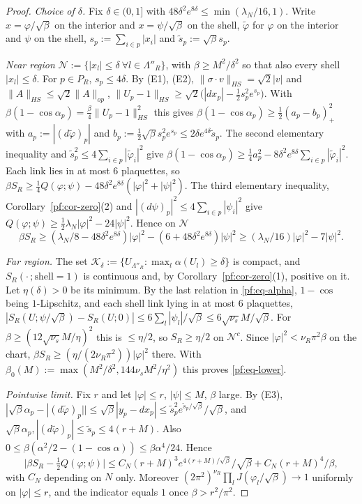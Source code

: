\begin{proof}
\emph{Choice of $\delta$.} Fix $\delta\in(0,1]$ with $48\delta^2e^{8\delta}\le\min(\lambda_N/16,1)$. Write $x=\varphi/\sqrt\beta$ on the interior and $x=\psi/\sqrt\beta$ on the shell, $\tilde\varphi$ for $\varphi$ on the interior and $\psi$ on the shell, $s_p:=\sum_{i\in p}|x_i|$ and $\tilde s_p:=\sqrt\beta s_p$.

\emph{Near region} $\mathcal N:=\{|x_l|\le\delta\ \forall l\in\Lambda''_R\}$, with $\beta\ge M^2/\delta^2$ so that also every shell $|x_l|\le\delta$. For $p\in P_R$, $s_p\le4\delta$. By (E1), (E2), $\|\sigma\cdot v\|_{HS}=\sqrt2|v|$ and $\|A\|_{HS}\le\sqrt2\|A\|_{op}$,
$\|U_p-1\|_{HS}\ge\sqrt2\big(|dx_p|-\tfrac12s_p^2e^{s_p}\big)$. With $\beta(1-\cos\alpha_p)=\frac\beta4\|U_p-1\|^2_{HS}$ this gives $\beta(1-\cos\alpha_p)\ge\tfrac12(a_p-b_p)_+^2$ with $a_p:=|(d\tilde\varphi)_p|$ and $b_p:=\tfrac12\sqrt\beta s_p^2e^{s_p}\le2\delta e^{4\delta}\tilde s_p$. The second elementary inequality and $\tilde s_p^2\le4\sum_{i\in p}|\tilde\varphi_i|^2$ give
$\beta(1-\cos\alpha_p)\ge\tfrac14a_p^2-8\delta^2e^{8\delta}\sum_{i\in p}|\tilde\varphi_i|^2$. Each link lies in at most $6$ plaquettes, so
$\beta S_R\ge\tfrac14Q(\varphi;\psi)-48\delta^2e^{8\delta}(|\varphi|^2+|\psi|^2)$. The third elementary inequality, Corollary~\ref{pf:cor-zero}(2) and $|(d\psi)_p|^2\le4\sum_{i\in p}|\psi_i|^2$ give $Q(\varphi;\psi)\ge\tfrac12\lambda_N|\varphi|^2-24|\psi|^2$. Hence on $\mathcal N$
\[
\beta S_R\ge(\lambda_N/8-48\delta^2e^{8\delta})|\varphi|^2-(6+48\delta^2e^{8\delta})|\psi|^2\ge(\lambda_N/16)|\varphi|^2-7|\psi|^2 .
\]

\emph{Far region.} The set $\mathcal K_\delta:=\{U_{\Lambda''_R}:\max_l\alpha(U_l)\ge\delta\}$ is compact, and $S_R(\cdot\,;\text{shell}=1)$ is continuous and, by Corollary~\ref{pf:cor-zero}(1), positive on it. Let $\eta(\delta)>0$ be its minimum. By the last relation in \eqref{pf:eq-alpha}, $1-\cos$ being $1$-Lipschitz, and each shell link lying in at most $6$ plaquettes,
$|S_R(U;\psi/\sqrt\beta)-S_R(U;0)|\le6\sum_l|\psi_l|/\sqrt\beta\le6\sqrt{\nu_s}M/\sqrt\beta$. For $\beta\ge(12\sqrt{\nu_s}M/\eta)^2$ this is $\le\eta/2$, so $S_R\ge\eta/2$ on $\mathcal N^c$. Since $|\varphi|^2<\nu_R\pi^2\beta$ on the chart, $\beta S_R\ge(\eta/(2\nu_R\pi^2))|\varphi|^2$ there. With $\beta_0(M):=\max(M^2/\delta^2,144\nu_sM^2/\eta^2)$ this proves \eqref{pf:eq-lower}.

\emph{Pointwise limit.} Fix $r$ and let $|\varphi|\le r$, $|\psi|\le M$, $\beta$ large. By (E3), $|\sqrt\beta\alpha_p-|(d\tilde\varphi)_p||\le\sqrt\beta|y_p-dx_p|\le\tilde s_p^2e^{\tilde s_p/\sqrt\beta}/\sqrt\beta$, and $\sqrt\beta\alpha_p,|(d\tilde\varphi)_p|\le\tilde s_p\le4(r+M)$. Also $0\le\beta(\alpha^2/2-(1-\cos\alpha))\le\beta\alpha^4/24$. Hence
\[
\big|\beta S_R-\tfrac12Q(\varphi;\psi)\big|\le C_N(r+M)^3e^{4(r+M)/\sqrt\beta}/\sqrt\beta+C_N(r+M)^4/\beta,
\]
with $C_N$ depending on $N$ only. Moreover $(2\pi^2)^{\nu_R}\prod_lJ(\varphi_l/\sqrt\beta)\to1$ uniformly on $|\varphi|\le r$, and the indicator equals $1$ once $\beta>r^2/\pi^2$.


\end{proof}
